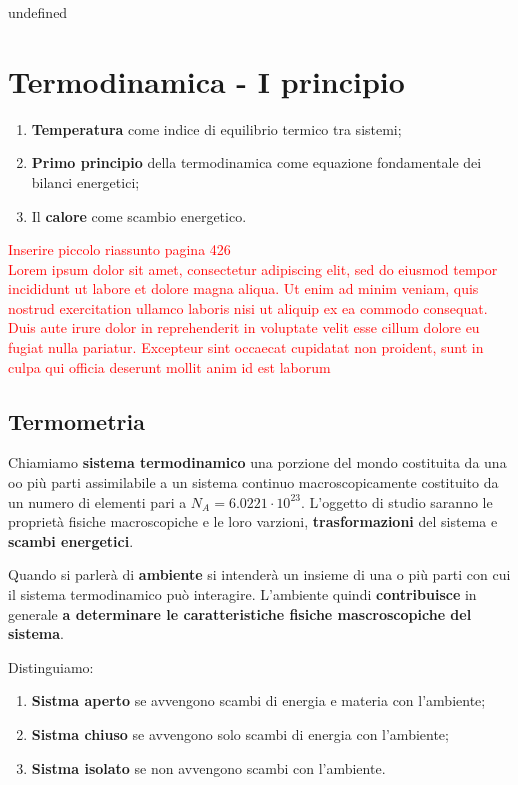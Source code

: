 undefined


\tableofcontents

\chapter{Termodinamica - I principio}
\begin{es}{}
	\begin{enumerate}
		\item \textbf{Temperatura} come indice di equilibrio termico tra sistemi;
		\item \textbf{Primo principio} della termodinamica come equazione fondamentale dei bilanci energetici;
		\item Il \textbf{calore} come scambio energetico.
	\end{enumerate}
\end{es}
	

\textcolor{red}{Inserire piccolo riassunto pagina 426}\\

\textcolor{red}{Lorem ipsum dolor sit amet, consectetur adipiscing elit, sed do eiusmod tempor incididunt ut labore et dolore magna aliqua. Ut enim ad minim veniam, quis nostrud exercitation ullamco laboris nisi ut aliquip ex ea commodo consequat. Duis aute irure dolor in reprehenderit in voluptate velit esse cillum dolore eu fugiat nulla pariatur. Excepteur sint occaecat cupidatat non proident, sunt in culpa qui officia deserunt mollit anim id est laborum}


\section{Termometria}
Chiamiamo \textbf{sistema termodinamico} una porzione del mondo costituita da una oo più parti assimilabile a un sistema continuo macroscopicamente costituito da un numero di elementi pari a \(N_A = 6.0221 \cdot 10^{23}\). L'oggetto di studio saranno le proprietà fisiche macroscopiche e le loro varzioni, \textbf{trasformazioni} del sistema e \textbf{scambi energetici}.

Quando si parlerà di \textbf{ambiente} si intenderà un insieme di una o più parti con cui il sistema termodinamico può interagire. L'ambiente quindi \textbf{contribuisce} in generale \textbf{a determinare le caratteristiche fisiche mascroscopiche del sistema}.

Distinguiamo:
\begin{enumerate}
	\item \textbf{Sistma aperto} se avvengono scambi di energia e materia con l'ambiente;
	\item \textbf{Sistma chiuso} se avvengono solo scambi di energia con l'ambiente;
	\item \textbf{Sistma isolato} se non avvengono scambi con l'ambiente.
\end{enumerate}

